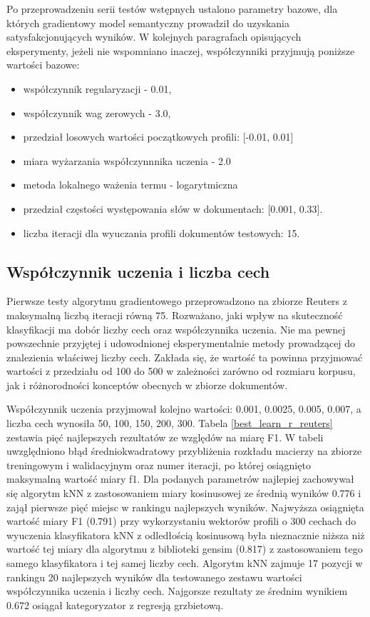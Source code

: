 \documentclass{pracamgr}
\begin{document}
Po przeprowadzeniu serii testów wstępnych ustalono parametry bazowe, dla których gradientowy model semantyczny prowadził do uzyskania satysfakcjonujących wyników. W kolejnych paragrafach opisujących eksperymenty, jeżeli nie wspomniano inaczej, współczynniki przyjmują poniższe wartości bazowe:

\begin{itemize}
    \item współczynnik regularyzacji - 0.01,
    \item współczynnik wag zerowych - 3.0,
    \item przedział losowych wartości początkowych profili: [-0.01, 0.01]
    \item miara wyżarzania współczynnnika uczenia - 2.0
    \item metoda lokalnego ważenia termu - logarytmiczna
    \item przedział częstości występowania słów w dokumentach: [0.001, 0.33].
    \item liczba iteracji dla wyuczania profili dokumentów testowych: 15.
\end{itemize}

\subsection{Współczynnik uczenia i liczba cech}

Pierwsze testy algorytmu gradientowego przeprowadzono na zbiorze Reuters z maksymalną liczbą iteracji równą 75. Rozważano, jaki wpływ na skuteczność klasyfikacji ma dobór liczby cech oraz współczynnika uczenia. Nie ma pewnej powszechnie przyjętej i udowodnionej eksperymentalnie metody prowadzącej do znalezienia właściwej liczby cech. Zakłada się, że wartość ta powinna przyjmować wartości z przedziału od 100 do 500 w zależności zarówno od rozmiaru korpusu, jak i różnorodności konceptów obecnych w zbiorze dokumentów.

Współczynnik uczenia przyjmował kolejno wartości: 0.001, 0.0025, 0.005, 0.007, a liczba cech wynosiła 50, 100, 150, 200, 300. Tabela \ref{best_learn_r_reuters} zestawia pięć najlepszych rezultatów ze względów na miarę F1. W tabeli uwzględniono błąd średniokwadratowy przybliżenia rozkładu macierzy na zbiorze treningowym i walidacyjnym oraz numer iteracji, po której osiągnięto maksymalną wartość miary f1. Dla podanych parametrów najlepiej zachowywał się algorytm kNN z zastosowaniem miary kosinusowej ze średnią wyników 0.776 i zajął pierwsze pięć miejsc w rankingu najlepszych wyników. Najwyższa osiągnięta wartość miary F1 (0.791) przy wykorzystaniu wektorów profili o 300 cechach do wyuczenia klasyfikatora kNN z odledłością kosinusową była nieznacznie niższa niż wartość tej miary dla algorytmu z biblioteki gensim (0.817) z zastosowaniem tego samego klasyfikatora i tej samej liczby cech. Algorytm kNN zajmuje 17 pozycji w rankingu 20 najlepszych wyników dla testowanego zestawu wartości współczynnika uczenia i liczby cech. Najgorsze rezultaty ze średnim wynikiem 0.672 osiągał kategoryzator z regresją grzbietową. 
\end{document}
